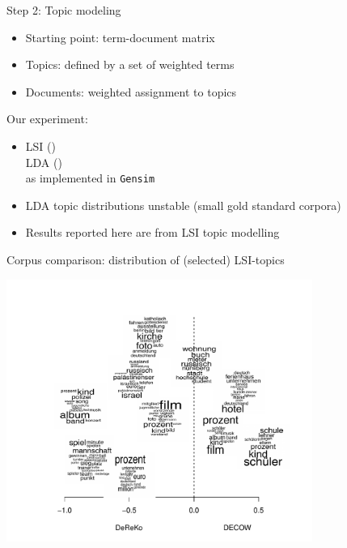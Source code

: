 \documentclass{beamer}
\begin{document}
\begin{frame}
  {Step 2: Topic modeling}

  \begin{itemize}
    \item Starting point: term-document matrix
    \item Topics: defined by a set of weighted terms
    \item Documents: weighted assignment to topics
  \end{itemize}
  \vspace{.5cm}
\pause
  Our experiment:
  \begin{itemize}
    \item LSI (\citealp{LandauerDumais1994})\\
          LDA (\citealp{BleiEa2003})\\
          as implemented in \texttt{Gensim} \citep{RehurekSojka2010}%
    \item LDA topic distributions unstable (small gold standard corpora)
    \item Results reported here are from LSI topic modelling
    \end{itemize}
\end{frame}


\begin{frame}
  {Corpus comparison: distribution of (selected) LSI-topics}
  \begin{center}
    \includegraphics[width=0.75\textwidth]{graphics/topics-logratios2bw}
  \end{center}
\end{frame}
\end{document}
